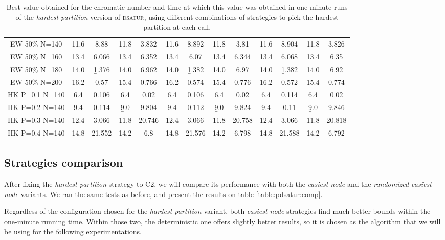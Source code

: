 \begin{sidewaystable}
\begin{tabular}{|c|cc|cc|cc|cc|cc|cc|}
\\
EW 50\% N=140 & \b{11.6} & 8.88 & 11.8 & 3.832 & \b{11.6} & 8.892 & 11.8 & 3.81 & \b{11.6} & 8.904 & 11.8 & 3.826
\\
EW 50\% N=160 & 13.4 & 6.066 & 13.4 & 6.352 & 13.4 & 6.07 & 13.4 & 6.344 & 13.4 & 6.068 & 13.4 & 6.35
\\
EW 50\% N=180 & 14.0 & \b{1.376} & 14.0 & 6.962 & 14.0 & \b{1.382} & 14.0 & 6.97 & 14.0 & \b{1.382} & 14.0 & 6.92
\\
EW 50\% N=200 & 16.2 & 0.57 & \b{15.4} & 0.766 & 16.2 & 0.574 & \b{15.4} & 0.776 & 16.2 & 0.572 & \b{15.4} & 0.774
\\
\hline
HK P=0.1 N=140 &  6.4 & 0.106 &  6.4 & 0.02 &  6.4 & 0.106 &  6.4 & 0.02 &  6.4 & 0.114 &  6.4 & 0.02
\\
HK P=0.2 N=140 &  9.4 & 0.114 &  \b{9.0} & 9.804 &  9.4 & 0.112 &  \b{9.0} & 9.824 &  9.4 & 0.11 &  \b{9.0} & 9.846
\\
HK P=0.3 N=140 & 12.4 & 3.066 & \b{11.8} & 20.746 & 12.4 & 3.066 & \b{11.8} & 20.758 & 12.4 & 3.066 & \b{11.8} & 20.818
\\
HK P=0.4 N=140 & 14.8 & 21.552 & \b{14.2} &  6.8 & 14.8 & 21.576 & \b{14.2} & 6.798 & 14.8 & 21.588 & \b{14.2} & 6.792
\\
\hline 
 \end{tabular}
\caption{Best value obtained for the chromatic number and time at which this value was obtained in one-minute runs of the \textit{hardest partition} version of \textsc{dsatur}, using different combinations of strategies to pick the hardest partition at each call.}
\label{table:pdsatur:hardp}

\end{sidewaystable}

\subsection{Strategies comparison}

After fixing the \textit{hardest partition} strategy to C2, we will compare its performance with both the \textit{easiest node} and the \textit{randomized easiest node} variants. We ran the same tests as before, and present the results on table \ref{table:pdsatur:comp}.

Regardless of the configuration chosen for the \textit{hardest partition} variant, both \textit{easiest node} strategies find much better bounds within the one-minute running time. Within those two, the deterministic one offers slightly better results, so it is chosen as the algorithm that we will be using for the following experimentations.

